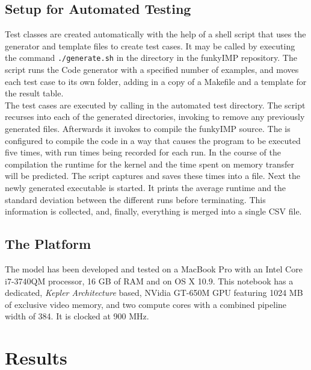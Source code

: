 \subsection{Setup for Automated Testing}
\label{sect:results_preamble_automated}

Test classes are created automatically with the help of a shell script that uses the generator and template files to create test cases. It may be called by executing the command \verb!./generate.sh! in the  directory in the funkyIMP repository. The script runs the Code generator with a specified number of examples, and moves each test case to its own folder, adding in a copy of a Makefile and a template for the result table.\\

The test cases are executed by calling  in the automated test directory. The script recurses into each of the generated directories, invoking  to remove any previously generated files. Afterwards it invokes  to compile the funkyIMP source. The  is configured to compile the code in a way that causes the program to be executed five times, with run times being recorded for each run. In the course of the compilation the runtime for the kernel and the time spent on memory transfer will be predicted. The script captures and saves these times into a file. Next the newly generated executable is started. It prints the average runtime and the standard deviation between the different runs before terminating. This information is collected, and, finally, everything is merged into a single CSV file. \\

\subsection{The Platform}
\label{sect:results_preamble_platform}
The model has been developed and tested on a MacBook Pro with an Intel Core i7-3740QM processor, 16 GB of RAM and on OS X 10.9. This notebook has a dedicated, \textit{Kepler Architecture} based, NVidia GT-650M GPU featuring 1024 MB of exclusive video memory, and two compute cores with a combined pipeline width of 384. It is clocked at 900 MHz.
\newpage



\section{Results}
\label{sect:results_results}

